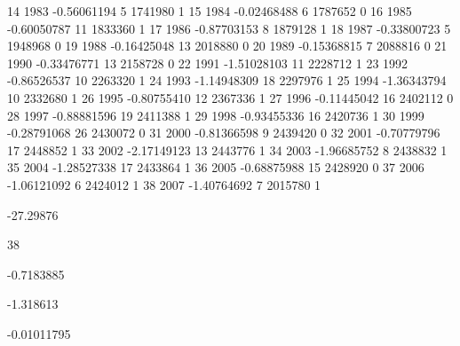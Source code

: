 \documentclass[a4paper]{article}                %
\begin{document}
\begin{Schunk}
\begin{Soutput}
14  1983        -0.56061194      5 1741980               1
15  1984        -0.02468488      6 1787652               0
16  1985        -0.60050787     11 1833360               1
17  1986        -0.87703153      8 1879128               1
18  1987        -0.33800723      5 1948968               0
19  1988        -0.16425048     13 2018880               0
20  1989        -0.15368815      7 2088816               0
21  1990        -0.33476771     13 2158728               0
22  1991        -1.51028103     11 2228712               1
23  1992        -0.86526537     10 2263320               1
24  1993        -1.14948309     18 2297976               1
25  1994        -1.36343794     10 2332680               1
26  1995        -0.80755410     12 2367336               1
27  1996        -0.11445042     16 2402112               0
28  1997        -0.88881596     19 2411388               1
29  1998        -0.93455336     16 2420736               1
30  1999        -0.28791068     26 2430072               0
31  2000        -0.81366598      9 2439420               0
32  2001        -0.70779796     17 2448852               1
33  2002        -2.17149123     13 2443776               1
34  2003        -1.96685752      8 2438832               1
35  2004        -1.28527338     17 2433864               1
36  2005        -0.68875988     15 2428920               0
37  2006        -1.06121092      6 2424012               1
38  2007        -1.40764692      7 2015780               1
\end{Soutput}
\begin{Soutput}
[1] -27.29876
\end{Soutput}
\begin{Soutput}
[1] 38
\end{Soutput}
\begin{Soutput}
[1] -0.7183885
\end{Soutput}
\begin{Soutput}
[1] -1.318613
\end{Soutput}
\begin{Soutput}
[1] -0.01011795
\end{Soutput}
\end{Schunk}
\end{document}
